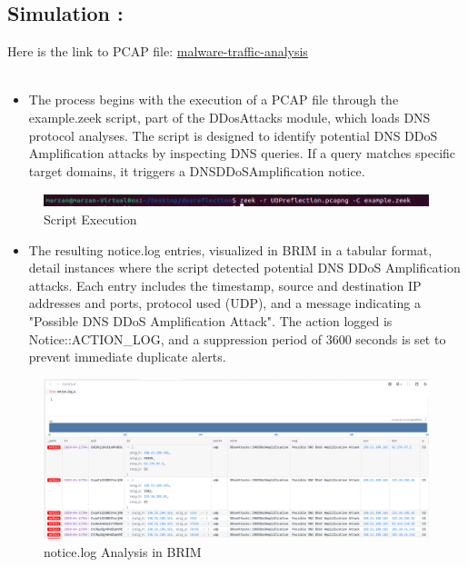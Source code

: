 \subsection{Simulation :}
Here is the link to PCAP file:
\href{https://www.malware-traffic-analysis.net/tutorials/index.html}{malware-traffic-analysis}\\\\
\begin{itemize}
    \item  The process begins with the execution of a PCAP file through the example.zeek script, part of the DDosAttacks module, which loads DNS protocol analyses. The script is designed to identify potential DNS DDoS Amplification attacks by inspecting DNS queries. If a query matches specific target domains, it triggers a DNSDDoSAmplification notice.
\end{itemize}
\begin{figure}[H]
    \centering
    \includegraphics[width=1\linewidth]{images//UDP_reflection/udp_1.png}
    \caption{Script Execution}
    \label{fig:enter-label}
\end{figure}

\begin{itemize}
    \item The resulting notice.log entries, visualized in BRIM in a tabular format, detail instances where the script detected potential DNS DDoS Amplification attacks. Each entry includes the timestamp, source and destination IP addresses and ports, protocol used (UDP), and a message indicating a "Possible DNS DDoS Amplification Attack". The action logged is Notice::ACTION\_LOG, and a suppression period of 3600 seconds is set to prevent immediate duplicate alerts.
\end{itemize}
\begin{figure}[H]
    \centering
    \includegraphics[width=1\linewidth]{images//UDP_reflection/udp_2.png}
    \caption{notice.log Analysis in BRIM}
    \label{fig:enter-label}
\end{figure}

